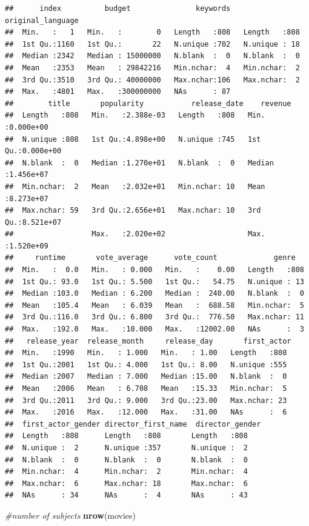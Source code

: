 \documentclass[
]{article}
\newenvironment{Shaded}{\begin{snugshade}}{\end{snugshade}}
\newcommand{\CommentTok}[1]{\textcolor[rgb]{0.56,0.35,0.01}{\textit{#1}}}
\newcommand{\FunctionTok}[1]{\textcolor[rgb]{0.13,0.29,0.53}{\textbf{#1}}}
\newcommand{\NormalTok}[1]{#1}
\begin{document}
\begin{verbatim}
##      index          budget               keywords   original_language
##  Min.   :   1   Min.   :        0   Length   :808   Length   :808    
##  1st Qu.:1160   1st Qu.:       22   N.unique :702   N.unique : 18    
##  Median :2342   Median : 15000000   N.blank  :  0   N.blank  :  0    
##  Mean   :2353   Mean   : 29842216   Min.nchar:  4   Min.nchar:  2    
##  3rd Qu.:3510   3rd Qu.: 40000000   Max.nchar:106   Max.nchar:  2    
##  Max.   :4801   Max.   :300000000   NAs      : 87                    
##        title       popularity           release_date    revenue         
##  Length   :808   Min.   :2.388e-03   Length   :808   Min.   :0.000e+00  
##  N.unique :808   1st Qu.:4.898e+00   N.unique :745   1st Qu.:0.000e+00  
##  N.blank  :  0   Median :1.270e+01   N.blank  :  0   Median :1.456e+07  
##  Min.nchar:  2   Mean   :2.032e+01   Min.nchar: 10   Mean   :8.273e+07  
##  Max.nchar: 59   3rd Qu.:2.656e+01   Max.nchar: 10   3rd Qu.:8.521e+07  
##                  Max.   :2.020e+02                   Max.   :1.520e+09  
##     runtime       vote_average      vote_count             genre    
##  Min.   :  0.0   Min.   : 0.000   Min.   :    0.00   Length   :808  
##  1st Qu.: 93.0   1st Qu.: 5.500   1st Qu.:   54.75   N.unique : 13  
##  Median :103.0   Median : 6.200   Median :  240.00   N.blank  :  0  
##  Mean   :105.4   Mean   : 6.039   Mean   :  688.58   Min.nchar:  5  
##  3rd Qu.:116.0   3rd Qu.: 6.800   3rd Qu.:  776.50   Max.nchar: 11  
##  Max.   :192.0   Max.   :10.000   Max.   :12002.00   NAs      :  3  
##   release_year  release_month     release_day       first_actor 
##  Min.   :1990   Min.   : 1.000   Min.   : 1.00   Length   :808  
##  1st Qu.:2001   1st Qu.: 4.000   1st Qu.: 8.00   N.unique :555  
##  Median :2007   Median : 7.000   Median :15.00   N.blank  :  0  
##  Mean   :2006   Mean   : 6.708   Mean   :15.33   Min.nchar:  5  
##  3rd Qu.:2011   3rd Qu.: 9.000   3rd Qu.:23.00   Max.nchar: 23  
##  Max.   :2016   Max.   :12.000   Max.   :31.00   NAs      :  6  
##  first_actor_gender director_first_name  director_gender
##  Length   :808      Length   :808       Length   :808   
##  N.unique :  2      N.unique :357       N.unique :  2   
##  N.blank  :  0      N.blank  :  0       N.blank  :  0   
##  Min.nchar:  4      Min.nchar:  2       Min.nchar:  4   
##  Max.nchar:  6      Max.nchar: 18       Max.nchar:  6   
##  NAs      : 34      NAs      :  4       NAs      : 43
\end{verbatim}

\begin{Shaded}
\begin{Highlighting}[]
\CommentTok{\#number of subjects }
\FunctionTok{nrow}\NormalTok{(movies)}
\end{Highlighting}
\end{Shaded}
\end{document}
